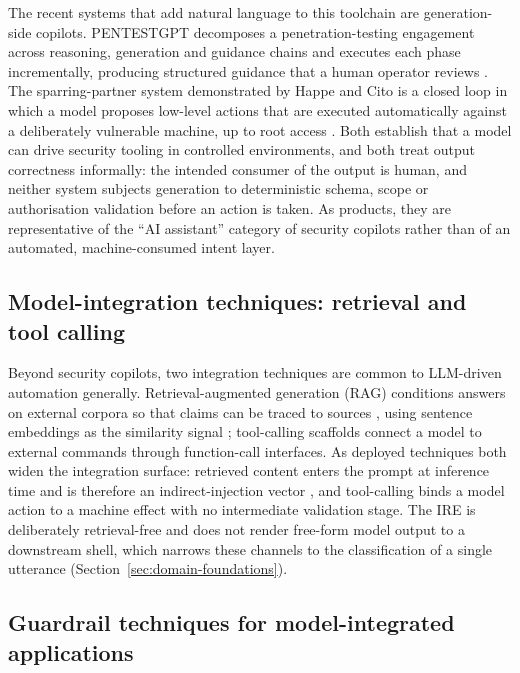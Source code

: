 The recent systems that add natural language to this toolchain are generation-side
copilots. PENTESTGPT decomposes a penetration-testing engagement across reasoning,
generation and guidance chains and executes each phase incrementally, producing
structured guidance that a human operator reviews \parencite{deng2024pentestgpt}.
The sparring-partner system demonstrated by Happe and Cito is a closed loop in
which a model proposes low-level actions that are executed automatically against
a deliberately vulnerable machine, up to root access \parencite{happe2023pwned}.
Both establish that a model can drive security tooling in controlled
environments, and both treat output correctness informally: the intended consumer
of the output is human, and neither system subjects generation to deterministic
schema, scope or authorisation validation before an action is taken. As products,
they are representative of the ``AI assistant'' category of security copilots
rather than of an automated, machine-consumed intent layer.

\subsection*{Model-integration techniques: retrieval and tool calling}

Beyond security copilots, two integration techniques are common to LLM-driven
automation generally. Retrieval-augmented generation (RAG) conditions answers on
external corpora so that claims can be traced to sources
\parencite{lewis2020rag}, using sentence embeddings as the similarity signal
\parencite{reimers2019sbert}; tool-calling scaffolds connect a model to external
commands through function-call interfaces. As deployed techniques both widen the
integration surface: retrieved content enters the prompt at inference time and is
therefore an indirect-injection vector \parencite{greshake2023indirect}, and
tool-calling binds a model action to a machine effect with no intermediate
validation stage. The IRE is deliberately retrieval-free and does not render
free-form model output to a downstream shell, which narrows these channels to the
classification of a single utterance (Section~\ref{sec:domain-foundations}).

\subsection*{Guardrail techniques for model-integrated applications}

